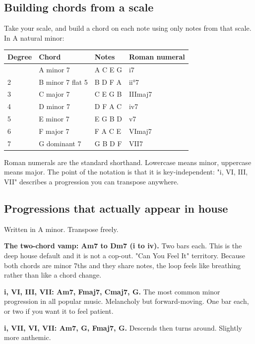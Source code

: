 \subsection{Building chords from a scale}\label{th04_harmony-building-chords-from-a-scale}

Take your scale, and build a chord on each note using only notes from that scale. In A
natural minor:

{\def\LTcaptype{none} %
\begin{longtable}[]{@{}llll@{}}
\toprule\noalign{}
Degree & Chord & Notes & Roman numeral \\
\midrule\noalign{}
\endhead
\bottomrule\noalign{}
\endlastfoot
1 & A minor 7 & A C E G & i7 \\
2 & B minor 7 flat 5 & B D F A & ii°7 \\
3 & C major 7 & C E G B & IIImaj7 \\
4 & D minor 7 & D F A C & iv7 \\
5 & E minor 7 & E G B D & v7 \\
6 & F major 7 & F A C E & VImaj7 \\
7 & G dominant 7 & G B D F & VII7 \\
\end{longtable}
}

Roman numerals are the standard shorthand. Lowercase means minor, uppercase means major.
The point of the notation is that it is key-independent: "i, VI, III, VII" describes a
progression you can transpose anywhere.

\subsection{Progressions that actually appear in house}\label{th04_harmony-progressions-that-actually-appear-in-house}

Written in A minor. Transpose freely.

\textbf{The two-chord vamp: Am7 to Dm7 (i to iv).} Two bars each. This is the deep house default
and it is not a cop-out. "Can You Feel It" territory. Because both chords are minor 7ths and
they share notes, the loop feels like breathing rather than like a chord change.

\textbf{i, VI, III, VII: Am7, Fmaj7, Cmaj7, G.} The most common minor progression in all popular
music. Melancholy but forward-moving. One bar each, or two if you want it to feel patient.

\textbf{i, VII, VI, VII: Am7, G, Fmaj7, G.} Descends then turns around. Slightly more anthemic.

